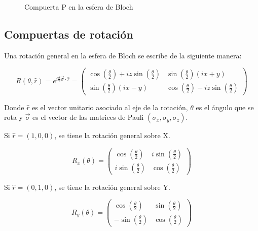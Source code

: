 \begin{figure}[H]
    \center
    \begin{blochsphere}[radius=1.5cm,tilt=15,rotation=-20,opacity=0.05]


    \end{blochsphere}
    \caption{Compuerta P en la esfera de Bloch}
    \label{fig:blochp}
\end{figure}

\subsection{Compuertas de rotación}

Una rotación general en la esfera de Bloch se escribe de la siguiente manera:

\[
R(\theta,\hat{r}) = e^{i \frac{\theta}{2} \vec{\sigma} \cdot \hat{r}} =
\begin{pmatrix}
\cos(\frac{\theta}{2}) + i z \sin(\frac{\theta}{2}) & \sin(\frac{\theta}{2}) (i x + y) \\
\sin(\frac{\theta}{2}) (i x - y) & \cos(\frac{\theta}{2}) - i z \sin(\frac{\theta}{2})
\end{pmatrix}
\]

Donde $\hat{r}$ es el vector unitario asociado al eje de la rotación, $\theta$ es el ángulo que se rota y $\vec{\sigma}$ es el vector de las matrices de Pauli $(\sigma_x, \sigma_y, \sigma_z)$.

Si $\hat{r} = (1,0,0)$, se tiene la rotación general sobre X.

\[
R_x(\theta) =
\begin{pmatrix}
\cos(\frac{\theta}{2}) & i \sin(\frac{\theta}{2}) \\
i\sin(\frac{\theta}{2}) & \cos(\frac{\theta}{2})
\end{pmatrix}
\]

Si $\hat{r} = (0,1,0)$, se tiene la rotación general sobre Y.

\[
R_y(\theta) =
\begin{pmatrix}
\cos(\frac{\theta}{2}) & \sin(\frac{\theta}{2}) \\
-\sin(\frac{\theta}{2}) & \cos(\frac{\theta}{2})
\end{pmatrix}
\]

